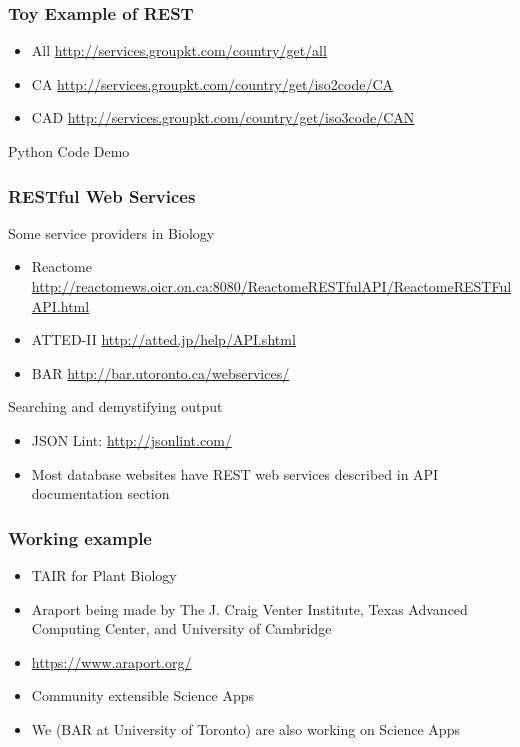 \documentclass{beamer}
\begin{document}
	\begin{frame}
		\frametitle{Toy Example of REST}
		\begin{itemize}
			\item All \url{http://services.groupkt.com/country/get/all}
			\item CA \url{http://services.groupkt.com/country/get/iso2code/CA}
			\item CAD \url{http://services.groupkt.com/country/get/iso3code/CAN}
		\end{itemize}
		Python Code Demo
	\end{frame}

	\begin{frame}
		\frametitle{RESTful Web Services}
		Some service providers in Biology
		\begin{itemize}
			\item Reactome \url{http://reactomews.oicr.on.ca:8080/ReactomeRESTfulAPI/ReactomeRESTFulAPI.html}
			\item ATTED-II \url{http://atted.jp/help/API.shtml}
			\item BAR \url{http://bar.utoronto.ca/webservices/}
		\end{itemize}
		Searching and demystifying output
		\begin{itemize}
			\item JSON Lint: \url{http://jsonlint.com/}
			\item Most database websites have REST web services described in API documentation section
		\end{itemize}
	\end{frame}

	\begin{frame}
		\frametitle{Working example}
		\begin{itemize}
			\item TAIR for Plant Biology 
			\item Araport being made by The J. Craig Venter Institute, Texas Advanced Computing Center, and University of Cambridge
			\item \url{https://www.araport.org/}
			\item Community extensible Science Apps
			\item We (BAR at University of Toronto) are also working on Science Apps
		\end{itemize}
	\end{frame}
\end{document}
